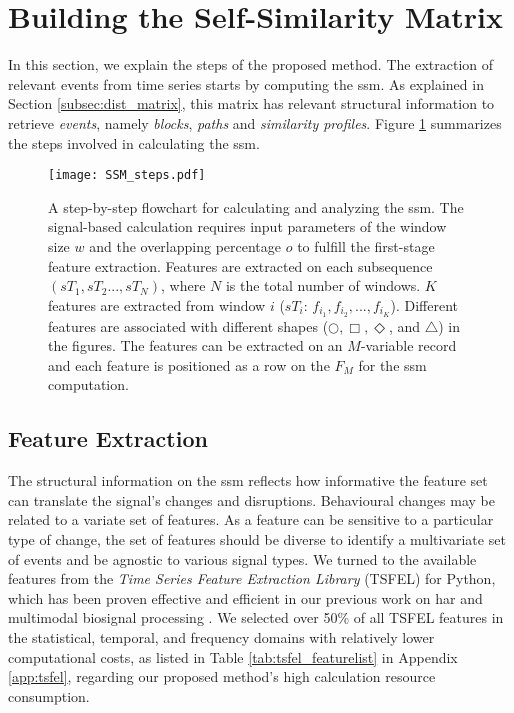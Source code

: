 \section{Building the Self-Similarity Matrix}

In this section, we explain the steps of the proposed method. The extraction of relevant events from time series starts by computing the \gls{ssm}. As explained in Section \ref{subsec:dist_matrix}, this matrix has relevant structural information to retrieve \textit{events}, namely \textit{blocks}, \textit{paths} and \textit{similarity profiles}. Figure \ref{fig:SSM_scheme} summarizes the steps involved in calculating the \gls{ssm}.

\begin{figure}
\centering
    \texttt{[image: SSM\_steps.pdf]}
    \caption{A step-by-step flowchart for calculating and analyzing the \gls{ssm}. The signal-based calculation requires input parameters of the window size $w$ and the overlapping percentage $o$ to fulfill the first-stage feature extraction. Features are extracted on each subsequence $(sT_1, sT_2..., sT_N)$, where $N$ is the total number of windows. $K$ features are extracted from window $i$ ($sT_i$: $f_{i_1}, f_{i_2}, ..., f_{i_K}$). Different features are associated with different shapes ($\bigcirc, \Box, \Diamond$, and $\triangle$) in the figures. The features can be extracted on an $M$-variable record and each feature is positioned as a row on the $F_M$ for the \gls{ssm} computation.}
    \label{fig:SSM_scheme}
\end{figure}

\subsection{Feature Extraction}

The structural information on the \gls{ssm} reflects how informative the feature set can translate the signal's changes and disruptions. Behavioural changes may be related to a variate set of features. As a feature can be sensitive to a particular type of change, the set of features should be diverse to identify a multivariate set of events and be agnostic to various signal types. We turned to the available features from the \textit{Time Series Feature Extraction Library} (TSFEL) \cite{barandas_tsfel_2020} for Python, which has been proven effective and efficient in our previous work on \gls{har} and multimodal biosignal processing \cite{liu22pipeline, liu2021thesis}. We selected over 50\% of all TSFEL features in the statistical, temporal, and frequency domains with relatively lower computational costs, as listed in Table \ref{tab:tsfel_featurelist} in Appendix \ref{app:tsfel}, regarding our proposed method's high calculation resource consumption.


